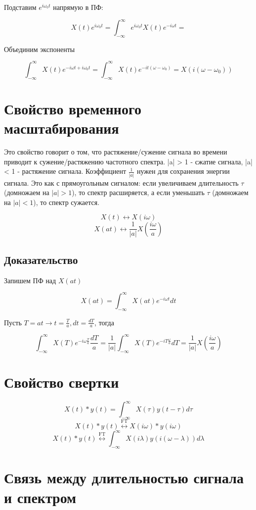Подставим $e^{i\omega_0t}$ напрямую в ПФ:

$$X(t)e^{i\omega_0t} = \int_{-\infty}^{\infty}e^{i\omega_0t}X(t)e^{-i\omega t} = $$ 

Объединим экспоненты

$$\int_{-\infty}^{\infty}X(t)e^{-i\omega t + i\omega_0t} = \int_{-\infty}^{\infty}X(t)e^{-it(\omega - \omega_0)} = X(i(\omega - \omega_0))$$

\section*{\textbf{Свойство временного масштабирования}}

Это свойство говорит о том, что растяжение/сужение сигнала во времени приводит к сужение/растяжению частотного спектра.
|a| > 1 - сжатие сигнала, |a| < 1 - растяжение сигнала. Коэффициент $\frac{1}{|a|}$ нужен для сохранения энергии сигнала. Это как с
прямоугольным сигналом: если увеличиваем длительность $\tau$ (домножаем на $|a| > 1$), то спектр расширяется, а если уменьшать $\tau$
(домножаем на $|a| < 1$), то спектр сужается. 

$$X(t)\leftrightarrow X(i\omega)$$
$$X(at)\leftrightarrow \frac{1}{|a|}X(\frac{i\omega}{a})$$

\subsection*{\textbf{Доказательство}}

Запишем ПФ над $X(at)$

$$X(at) = \int_{-\infty}^{\infty} X(at)e^{-i\omega t}dt$$

Пусть $T = at \to t = \frac{T}{a}, dt = \frac{dT}{a}$, тогда

$$\int_{-\infty}^{\infty} X(T)e^{-i\omega \frac{T}{a}}\frac{dT}{a} = \frac{1}{|a|}\int_{-\infty}^{\infty} X(T)e^{-iT \frac{\omega}{a}}dT =
\frac{1}{|a|}X(\frac{i\omega}{a})$$

\section*{\textbf{Свойство свертки}}

$$X(t)*y(t) = \int_{-\infty}^{\infty}X(\tau)y(t-\tau)d\tau$$
$$X(t)*y(t) \overset{\text{FT}}{\leftrightarrow} X(i\omega) * y(i\omega)$$
$$X(t)*y(t) \overset{\text{FT}}{\leftrightarrow} \int_{-\infty}^{\infty}X(i\lambda) y(i(\omega - \lambda))d\lambda$$


\section*{\textbf{Связь между длительностью сигнала и спектром}}

